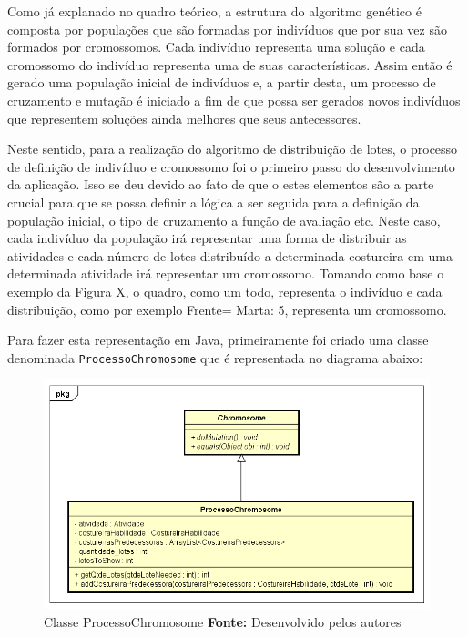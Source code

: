 \par Como já explanado no quadro teórico, a estrutura do algoritmo genético é composta
por populações que são formadas por indivíduos que por sua vez são formados por cromossomos.
Cada indivíduo representa uma solução e cada cromossomo do indivíduo representa uma de suas características. 
Assim então é gerado uma população inicial de indivíduos e, a partir desta, um processo de cruzamento 
e mutação é iniciado a fim de que possa ser gerados novos indivíduos que representem soluções ainda melhores 
que seus antecessores.

\par Neste sentido, para a realização do algoritmo de distribuição de lotes, o processo de definição de indivíduo
e cromossomo foi o primeiro passo do desenvolvimento da aplicação. Isso se deu devido ao fato de que o estes elementos
são a parte crucial para que se possa definir a lógica a ser seguida para a definição da população inicial, o tipo de cruzamento 
a função de avaliação etc. Neste caso, cada indivíduo da população irá representar uma forma de distribuir as atividades e
cada número de lotes distribuído a determinada costureira em uma determinada atividade irá representar um cromossomo. Tomando como 
base o exemplo da Figura X, o quadro, como um todo, representa o indivíduo e cada distribuição, como por exemplo Frente= Marta: 5, 
representa um cromossomo.

\par Para fazer esta representação em Java, primeiramente foi criado uma classe denominada \texttt{ProcessoChromosome} que é
representada no diagrama abaixo:

\begin{figure}[h!]
	\centerline{\includegraphics[scale=0.6]{./imagens/processo_chromosome_diagram.png}}
	\caption[ProcessoChromosome Class]
	{Classe ProcessoChromosome \textbf{Fonte:} Desenvolvido pelos autores}
	\label{fig:exemplo1}
\end{figure}


